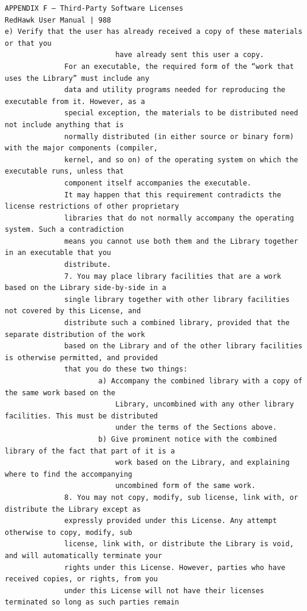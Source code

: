 \begin{lstlisting}[basicstyle=\ttfamily\scriptsize,breaklines=true]
APPENDIX F — Third-Party Software Licenses                                    RedHawk User Manual | 988
e) Verify that the user has already received a copy of these materials or that you
                          have already sent this user a copy.
              For an executable, the required form of the “work that uses the Library” must include any
              data and utility programs needed for reproducing the executable from it. However, as a
              special exception, the materials to be distributed need not include anything that is
              normally distributed (in either source or binary form) with the major components (compiler,
              kernel, and so on) of the operating system on which the executable runs, unless that
              component itself accompanies the executable.
              It may happen that this requirement contradicts the license restrictions of other proprietary
              libraries that do not normally accompany the operating system. Such a contradiction
              means you cannot use both them and the Library together in an executable that you
              distribute.
              7. You may place library facilities that are a work based on the Library side-by-side in a
              single library together with other library facilities not covered by this License, and
              distribute such a combined library, provided that the separate distribution of the work
              based on the Library and of the other library facilities is otherwise permitted, and provided
              that you do these two things:
                      a) Accompany the combined library with a copy of the same work based on the
                          Library, uncombined with any other library facilities. This must be distributed
                          under the terms of the Sections above.
                      b) Give prominent notice with the combined library of the fact that part of it is a
                          work based on the Library, and explaining where to find the accompanying
                          uncombined form of the same work.
              8. You may not copy, modify, sub license, link with, or distribute the Library except as
              expressly provided under this License. Any attempt otherwise to copy, modify, sub
              license, link with, or distribute the Library is void, and will automatically terminate your
              rights under this License. However, parties who have received copies, or rights, from you
              under this License will not have their licenses terminated so long as such parties remain

\end{lstlisting}
